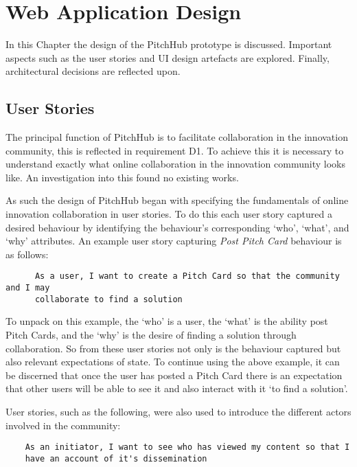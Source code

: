 
\chapter{Web Application Design}\label{C:design_web}

In this Chapter the design of the PitchHub prototype is discussed. Important aspects such as the user stories and UI design artefacts are explored. Finally, architectural decisions are reflected upon.

\section{User Stories}

The principal function of PitchHub is to facilitate collaboration in the innovation community, this is reflected in requirement D1. To achieve this it is necessary to understand exactly what online collaboration in the innovation community looks like. An investigation into this found no existing works. 

As such the design of PitchHub began with specifying the fundamentals of online innovation collaboration in user stories. To do this each user story captured a desired behaviour by identifying the behaviour's corresponding `who', `what', and `why' attributes. An example user story capturing \textit{Post Pitch Card} behaviour is as follows:

\begin{verbatim}
	  As a user, I want to create a Pitch Card so that the community and I may 
	  collaborate to find a solution	
\end{verbatim}

To unpack on this example, the `who' is a user, the `what' is the ability post Pitch Cards, and the `why' is the desire of finding a solution through collaboration.
So from these user stories not only is the behaviour captured but also relevant expectations of state. To continue using the above example, it can be discerned that once the user has posted a Pitch Card there is an expectation that other users will be able to see it and also interact with it `to find a solution'. 

User stories, such as the following, were also used to introduce the different actors involved in the community:

\begin{verbatim}
    As an initiator, I want to see who has viewed my content so that I 
    have an account of it's dissemination
\end{verbatim}

